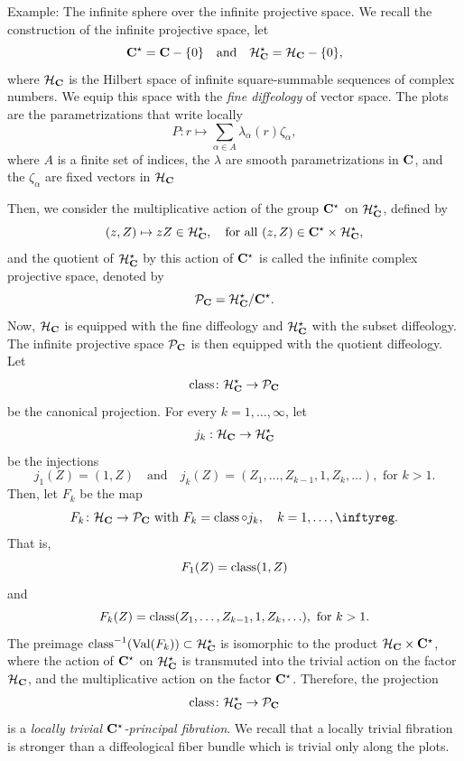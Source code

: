 \begin{Article}{Example: The infinite sphere over the infinite projective space.}{}%
  \linebreak%
  \label{The-Infinite-Sphere-over-the-Infinite-Projective-Space}
  We recall the construction of the infinite projective space,
  let
  $$%
    \CC^{\star} = \CC- \{0\}
    \quad \text{and} \quad
    \cH_{\CC}^{\star} = \cH_{\CC} - \{0\},
  $$%
  where $\mathcal{H}_{\mathbf{C}}$ is the Hilbert space of infinite square-summable sequences of complex numbers.
  We equip this space with the \emph{fine diffeology} of vector space.
  The plots are the parametrizations that write locally
  $$%
    P \colon r \mapsto \sum_{\alpha \in A} \lambda_\alpha(r) \zeta_\alpha,
  $$%
  where $A$ is a finite set of indices,
  the $\lambda$ are smooth parametrizations in $\mathbf{C}$,
  and the $\zeta_\alpha$ are fixed vectors in $\mathcal{H}_{\mathbf{C}}$

  Then,
  we consider the multiplicative action of the group $\mathbf{C}^{\star}$ on  $\mathcal{H}_{\mathbf{C}}^{\star}$,
  defined by
  $$%
    (z,Z)\mapsto zZ \in \cH_{\CC}^{\star}, \quad \text{for all } (z,Z) \in \CC^{\star} \times \cH_{\CC}^{\star},
  $$%
  and the quotient of $\mathcal{H}_{\mathbf{C}}^{\star}$ by this action of $\mathbf{C}^{\star}$ is called the infinite complex projective space,
  denoted by
  $$%
    \cP_{\CC} = \cH_{\CC}^\star / \CC^\star.
  $$%
  Now,
  $\mathcal{H}_{\mathbf{C}}$ is equipped with the fine diffeology and  $\mathcal{H}_{\mathbf{C}}^{\star}$ with the subset diffeology.
  The infinite projective space $\mathcal{P}_{\mathbf{C}}$ is then equipped with the quotient diffeology.
  Let
  $$%
    \Class \colon \cH_{\CC}^{\star} \to \cP_{\CC}
  $$%
  be the canonical projection.
  For every $k = 1, \ldots, \infty$,
  let
  $$%
    j_k : \cH_{\CC} \to \cH_{\CC}^{\star}
  $$%
  be the injections
  $$%
    j_1(Z) = (1, Z)
    \quad \text{and} \quad
    j_k(Z) = (Z_1,\ldots, Z_{k-1}, 1, Z_k,\ldots), \text{ for } k> 1.
  $$%
  Then,
  let $F_k$ be the map
  $$%
    F_k \colon \cH_{\CC} \to \cP_{\CC}
    \SpacedText{with}
    F_k = \Class \circ j_k, \quad k=1, \ldots, \infty.
  $$%
  That is,
  $$%
    F_1(Z) = \Class(1,Z)
  $$%
  and
  $$%
    F_k(Z) = \Class(Z_1,\ldots, Z_{k-1}, 1, Z_k,\ldots), \text{ for } k> 1.
  $$%
   The preimage $\operatorname{class}^{-1}(\operatorname{Val}(F_k)) \subset \mathcal{H}_{\mathbf{C}}^\star$ is isomorphic to the product $\mathcal{H}_{\mathbf{C}} \times \mathbf{C}^\star$,
  where the action of $\mathbf{C}^\star$ on $\mathcal{H}_{\mathbf{C}}^\star$ is transmuted into the trivial action on the factor $\mathcal{H}_{\mathbf{C}}$,
  and the multiplicative action on the factor $\mathbf{C}^\star$.
  Therefore,
  the projection
  $$%
    \Class \colon \cH_{\CC}^{\star} \to \cP_{\CC}
  $$%
  is a \emph{locally trivial $\mathbf{C}^\star$-principal fibration}.
  We recall that a locally trivial fibration is stronger than a diffeological fiber bundle which is trivial only along the plots.
\end{Article} %

